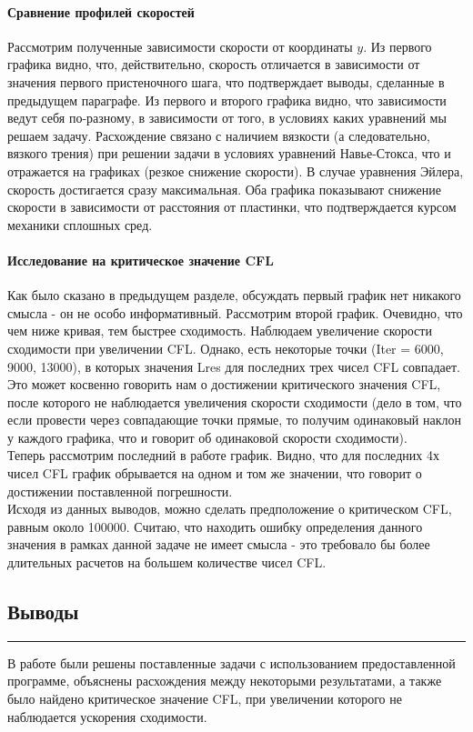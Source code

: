 \documentclass[12pt,a4paper, titlepage]{article}
\begin{document}
\paragraph{Сравнение профилей скоростей}
Рассмотрим полученные зависимости скорости от координаты $y$. Из первого графика видно, что, действительно, скорость отличается в зависимости от значения первого пристеночного шага, что подтверждает выводы, сделанные в предыдущем параграфе. Из первого и второго графика видно, что зависимости ведут себя по-разному, в зависимости от того, в условиях каких уравнений мы решаем задачу. Расхождение связано с наличием вязкости (а следовательно, вязкого трения) при решении задачи в условиях уравнений Навье-Стокса, что и отражается на графиках (резкое снижение скорости). В случае уравнения Эйлера, скорость достигается сразу максимальная. Оба графика показывают снижение скорости в зависимости от расстояния от пластинки, что подтверждается курсом механики сплошных сред.
\paragraph{Исследование на критическое значение CFL}
Как было сказано в предыдущем разделе, обсуждать первый график нет никакого смысла - он не особо информативный. Рассмотрим второй график. Очевидно, что чем ниже кривая, тем быстрее сходимость. Наблюдаем увеличение скорости сходимости при увеличении CFL. Однако, есть некоторые точки (Iter = 6000, 9000, 13000), в которых значения Lres для последних трех чисел CFL совпадает. Это может косвенно говорить нам о достижении критического значения CFL, после которого не наблюдается увеличения скорости сходимости (дело в том, что если провести через совпадающие точки прямые, то получим одинаковый наклон у каждого графика, что и говорит об одинаковой скорости сходимости). 
\\
Теперь рассмотрим последний в работе график. Видно, что для последних 4х чисел CFL график обрывается на одном и том же значении, что говорит о достижении поставленной погрешности.
\\
Исходя из данных выводов, можно сделать предположение о критическом CFL, равным около 100000. Считаю, что находить ошибку определения данного значения в рамках данной задаче не имеет смысла - это требовало бы более длительных расчетов на большем количестве чисел CFL.
\subsection*{Выводы}
\noindent\rule{\textwidth}{1pt}
В работе были решены поставленные задачи с использованием предоставленной программе, объяснены расхождения между некоторыми результатами, а также было найдено критическое значение CFL, при увеличении которого не наблюдается ускорения сходимости.
\end{document}

